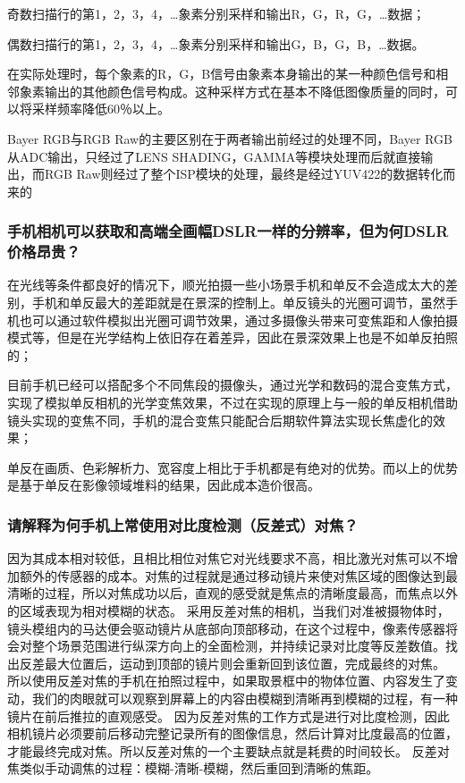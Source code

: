 \documentclass[UTF8,a4paper,AutoFakeBold,AutoFakeSlant]{ctexart}
\begin{document}
奇数扫描行的第1，2，3，4，…象素分别采样和输出R，G，R，G，…数据；

偶数扫描行的第1，2，3，4，…象素分别采样和输出G，B，G，B，…数据。

在实际处理时，每个象素的R，G，B信号由象素本身输出的某一种颜色信号和相邻象素输出的其他颜色信号构成。这种采样方式在基本不降低图像质量的同时，可以将采样频率降低60％以上。

 Bayer RGB与RGB Raw的主要区别在于两者输出前经过的处理不同，Bayer RGB从ADC输出，只经过了LENS SHADING，GAMMA等模块处理而后就直接输出，而RGB Raw则经过了整个ISP模块的处理，最终是经过YUV422的数据转化而来的


\subsubsection{手机相机可以获取和高端全画幅DSLR一样的分辨率，但为何DSLR价格昂贵？}

在光线等条件都良好的情况下，顺光拍摄一些小场景手机和单反不会造成太大的差别，手机和单反最大的差距就是在景深的控制上。单反镜头的光圈可调节，虽然手机也可以通过软件模拟出光圈可调节效果，通过多摄像头带来可变焦距和人像拍摄模式等，但是在光学结构上依旧存在着差异，因此在景深效果上也是不如单反拍照的；

目前手机已经可以搭配多个不同焦段的摄像头，通过光学和数码的混合变焦方式，实现了模拟单反相机的光学变焦效果，不过在实现的原理上与一般的单反相机借助镜头实现的变焦不同，手机的混合变焦只能配合后期软件算法实现长焦虚化的效果；

单反在画质、色彩解析力、宽容度上相比于手机都是有绝对的优势。而以上的优势是基于单反在影像领域堆料的结果，因此成本造价很高。


\subsubsection{请解释为何手机上常使用对比度检测（反差式）对焦？}

因为其成本相对较低，且相比相位对焦它对光线要求不高，相比激光对焦可以不增加额外的传感器的成本。对焦的过程就是通过移动镜片来使对焦区域的图像达到最清晰的过程，所以对焦成功以后，直观的感受就是焦点的清晰度最高，而焦点以外的区域表现为相对模糊的状态。
采用反差对焦的相机，当我们对准被摄物体时，镜头模组内的马达便会驱动镜片从底部向顶部移动，在这个过程中，像素传感器将会对整个场景范围进行纵深方向上的全面检测，并持续记录对比度等反差数值。找出反差最大位置后，运动到顶部的镜片则会重新回到该位置，完成最终的对焦。
所以使用反差对焦的手机在拍照过程中，如果取景框中的物体位置、内容发生了变动，我们的肉眼就可以观察到屏幕上的内容由模糊到清晰再到模糊的过程，有一种镜片在前后推拉的直观感受。
因为反差对焦的工作方式是进行对比度检测，因此相机镜片必须要前后移动完整记录所有的图像信息，然后计算对比度最高的位置，才能最终完成对焦。所以反差对焦的一个主要缺点就是耗费的时间较长。
反差对焦类似手动调焦的过程：模糊-清晰-模糊，然后重回到清晰的焦距。
\end{document}
